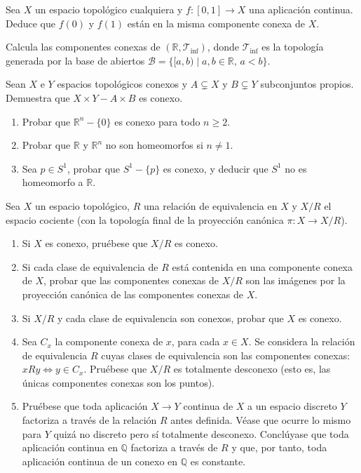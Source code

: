 \begin{ejer}[141]
Sea $X$ un espacio topológico cualquiera y $f \colon [0,1] \to X$ una aplicación continua. Deduce que $f(0)$ y $f(1)$ están en la misma componente conexa de $X$.
\end{ejer}

\begin{ejer}[142]
Calcula las componentes conexas de $(\mathbb{R}, \mathcal{T}_{\mathrm{inf}})$, donde $\mathcal{T}_{\mathrm{inf}}$ es la topología generada por la base de abiertos $\mathcal{B} = \{[a,b) \mid a,b \in \mathbb{R}, \, a < b\}$.
\end{ejer}

\begin{ejer}[143]
Sean $X$ e $Y$ espacios topológicos conexos y $A \subsetneq X$ y $B \subsetneq Y$ subconjuntos propios. Demuestra que $X \times Y - A \times B$ es conexo.
\end{ejer}

\begin{ejer}[144]
\begin{enumerate}
    \item[a)] Probar que $\mathbb{R}^n - \{0\}$ es conexo para todo $n \ge 2$.
    \item[b)] Probar que $\mathbb{R}$ y $\mathbb{R}^n$ no son homeomorfos si $n \neq 1$.
    \item[c)] Sea $p \in S^1$, probar que $S^1 - \{p\}$ es conexo, y deducir que $S^1$ no es homeomorfo a $\mathbb{R}$.
\end{enumerate}
\end{ejer}

\begin{ejer}[145]
Sea $X$ un espacio topológico, $R$ una relación de equivalencia en $X$ y $X/R$ el espacio cociente (con la topología final de la proyección canónica $\pi \colon X \to X/R$).
\begin{enumerate}
    \item[a)] Si $X$ es conexo, pruébese que $X/R$ es conexo.
    \item[b)] Si cada clase de equivalencia de $R$ está contenida en una componente conexa de $X$, probar que las componentes conexas de $X/R$ son las imágenes por la proyección canónica de las componentes conexas de $X$.
    \item[c)] Si $X/R$ y cada clase de equivalencia son conexos, probar que $X$ es conexo.
    \item[d)] Sea $C_x$ la componente conexa de $x$, para cada $x \in X$. Se considera la relación de equivalencia $R$ cuyas clases de equivalencia son las componentes conexas: $x R y \iff y \in C_x$. Pruébese que $X/R$ es totalmente desconexo (esto es, las únicas componentes conexas son los puntos).
    \item[e)] Pruébese que toda aplicación $X \to Y$ continua de $X$ a un espacio discreto $Y$ factoriza a través de la relación $R$ antes definida. Véase que ocurre lo mismo para $Y$ quizá no discreto pero sí totalmente desconexo. Conclúyase que toda aplicación continua en $\mathbb{Q}$ factoriza a través de $R$ y que, por tanto, toda aplicación continua de un conexo en $\mathbb{Q}$ es constante.
\end{enumerate}
\end{ejer}

